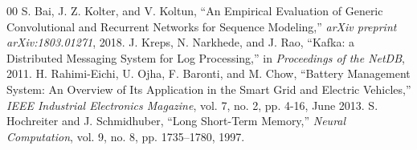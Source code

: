 \begin{thebibliography}{00}
 S. Bai, J. Z. Kolter, and V. Koltun, ``An Empirical Evaluation of Generic Convolutional and Recurrent Networks for Sequence Modeling,'' \textit{arXiv preprint arXiv:1803.01271}, 2018.
 J. Kreps, N. Narkhede, and J. Rao, ``Kafka: a Distributed Messaging System for Log Processing,'' in \textit{Proceedings of the NetDB}, 2011.
 H. Rahimi-Eichi, U. Ojha, F. Baronti, and M. Chow, ``Battery Management System: An Overview of Its Application in the Smart Grid and Electric Vehicles,'' \textit{IEEE Industrial Electronics Magazine}, vol. 7, no. 2, pp. 4-16, June 2013.
 S. Hochreiter and J. Schmidhuber, ``Long Short-Term Memory,'' \textit{Neural Computation}, vol. 9, no. 8, pp. 1735--1780, 1997.
\end{thebibliography}

